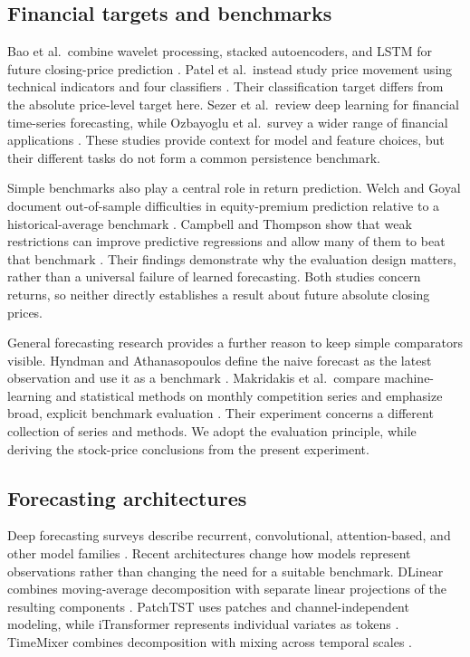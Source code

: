 \subsection{Financial targets and benchmarks}

Bao et al.\ combine wavelet processing, stacked autoencoders, and LSTM for future closing-price prediction \cite{bao2017deep}. Patel et al.\ instead study price movement using technical indicators and four classifiers \cite{patel2015trend}. Their classification target differs from the absolute price-level target here. Sezer et al.\ review deep learning for financial time-series forecasting, while Ozbayoglu et al.\ survey a wider range of financial applications \cite{sezer2020stockreview,ozbayoglu2020financialsurvey}. These studies provide context for model and feature choices, but their different tasks do not form a common persistence benchmark.

Simple benchmarks also play a central role in return prediction. Welch and Goyal document out-of-sample difficulties in equity-premium prediction relative to a historical-average benchmark \cite{welch2008comprehensive}. Campbell and Thompson show that weak restrictions can improve predictive regressions and allow many of them to beat that benchmark \cite{campbell2008predicting}. Their findings demonstrate why the evaluation design matters, rather than a universal failure of learned forecasting. Both studies concern returns, so neither directly establishes a result about future absolute closing prices.

General forecasting research provides a further reason to keep simple comparators visible. Hyndman and Athanasopoulos define the naive forecast as the latest observation and use it as a benchmark \cite{hyndman2018forecasting}. Makridakis et al.\ compare machine-learning and statistical methods on monthly competition series and emphasize broad, explicit benchmark evaluation \cite{makridakis2018concerns}. Their experiment concerns a different collection of series and methods. We adopt the evaluation principle, while deriving the stock-price conclusions from the present experiment.

\subsection{Forecasting architectures}

Deep forecasting surveys describe recurrent, convolutional, attention-based, and other model families \cite{lim2021survey,benidis2022tutorial}. Recent architectures change how models represent observations rather than changing the need for a suitable benchmark. DLinear combines moving-average decomposition with separate linear projections of the resulting components \cite{zeng2023transformers}. PatchTST uses patches and channel-independent modeling, while iTransformer represents individual variates as tokens \cite{nie2023patchtst,liu2024itransformer}. TimeMixer combines decomposition with mixing across temporal scales \cite{wang2024timemixer}.

